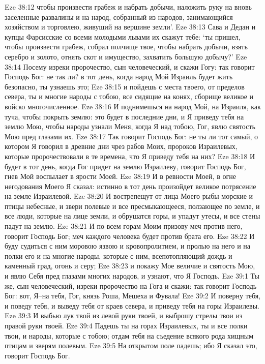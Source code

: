 Eze 38:12  чтобы произвести грабеж и набрать добычи, наложить руку на вновь заселенные развалины и на народ, собранный из народов, занимающийся хозяйством и торговлею, живущий на вершине земли'.
Eze 38:13  Сава и Дедан и купцы Фарсисские со всеми молодыми львами их скажут тебе: `ты пришел, чтобы произвести грабеж, собрал полчище твое, чтобы набрать добычи, взять серебро и золото, отнять скот и имущество, захватить большую добычу?'
Eze 38:14  Посему изреки пророчество, сын человеческий, и скажи Гогу: так говорит Господь Бог: не так ли? в тот день, когда народ Мой Израиль будет жить безопасно, ты узнаешь это;
Eze 38:15  и пойдешь с места твоего, от пределов севера, ты и многие народы с тобою, все сидящие на конях, сборище великое и войско многочисленное.
Eze 38:16  И поднимешься на народ Мой, на Израиля, как туча, чтобы покрыть землю: это будет в последние дни, и Я приведу тебя на землю Мою, чтобы народы узнали Меня, когда Я над тобою, Гог, явлю святость Мою пред глазами их.
Eze 38:17  Так говорит Господь Бог: не ты ли тот самый, о котором Я говорил в древние дни чрез рабов Моих, пророков Израилевых, которые пророчествовали в те времена, что Я приведу тебя на них?
Eze 38:18  И будет в тот день, когда Гог придет на землю Израилеву, говорит Господь Бог, гнев Мой воспылает в ярости Моей.
Eze 38:19  И в ревности Моей, в огне негодования Моего Я сказал: истинно в тот день произойдет великое потрясение на земле Израилевой.
Eze 38:20  И вострепещут от лица Моего рыбы морские и птицы небесные, и звери полевые и все пресмыкающееся, ползающее по земле, и все люди, которые на лице земли, и обрушатся горы, и упадут утесы, и все стены падут на землю.
Eze 38:21  И по всем горам Моим призову меч против него, говорит Господь Бог; меч каждого человека будет против брата его.
Eze 38:22  И буду судиться с ним моровою язвою и кровопролитием, и пролью на него и на полки его и на многие народы, которые с ним, всепотопляющий дождь и каменный град, огонь и серу;
Eze 38:23  и покажу Мое величие и святость Мою, и явлю Себя пред глазами многих народов, и узнают, что Я Господь.
Eze 39:1  Ты же, сын человеческий, изреки пророчество на Гога и скажи: так говорит Господь Бог: вот, Я--на тебя, Гог, князь Роша, Мешеха и Фувала!
Eze 39:2  И поверну тебя, и поведу тебя, и выведу тебя от краев севера, и приведу тебя на горы Израилевы.
Eze 39:3  И выбью лук твой из левой руки твоей, и выброшу стрелы твои из правой руки твоей.
Eze 39:4  Падешь ты на горах Израилевых, ты и все полки твои, и народы, которые с тобою; отдам тебя на съедение всякого рода хищным птицам и зверям полевым.
Eze 39:5  На открытом поле падешь; ибо Я сказал это, говорит Господь Бог.
